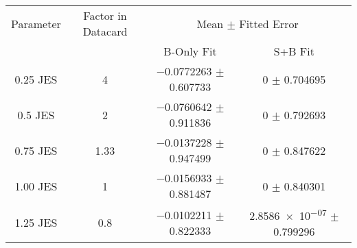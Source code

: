 \begin{scriptsize}
\begin{table}
\centering
\begin{tabular}{cccc}
\toprule
Parameter & Factor in Datacard & \multicolumn{2}{c}{{Mean $\pm$ Fitted Error}}\\
 & & {B-Only Fit} & {S+B Fit}\\
\midrule
\num{0.25} JES & 4 & \num{-0.0772263} $\pm$ \num{0.607733} & \num{0} $\pm$ \num{0.704695}\\
\num{0.5} JES & 2 & \num{-0.0760642} $\pm$ \num{0.911836} & \num{0} $\pm$ \num{0.792693}\\
\num{0.75} JES & \num{1.33} & \num{-0.0137228} $\pm$ \num{0.947499} & \num{0} $\pm$ \num{0.847622}\\
\num{1.00} JES & 1 & \num{-0.0156933} $\pm$ \num{0.881487} & \num{0} $\pm$ \num{0.840301}\\
\num{1.25} JES & \num{0.8} & \num{-0.0102211} $\pm$ \num{0.822333} & \num{2.8586e-07} $\pm$ \num{0.799296}\\

\bottomrule
\end{tabular}
\end{table}
\end{scriptsize}
